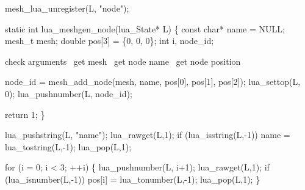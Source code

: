 \nwenddocs{}\endmoddef
mesh_lua_unregister(L, "node");
\nwendcode{}\nwdocspar

\nwenddocs{}\endmoddef
static int lua_meshgen_node(lua_State* L)
\{
    const char* name = NULL;
    mesh_t mesh;
    double pos[3] = \{0, 0, 0\};
    int i, node_id;

    \LA{}check arguments~{\nwtagstyle{}}\RA{}
    \LA{}get \code{}mesh\edoc{}~{\nwtagstyle{}}\RA{}
    \LA{}get node name~{\nwtagstyle{}}\RA{}
    \LA{}get node position~{\nwtagstyle{}}\RA{}

    node_id = mesh_add_node(mesh, name, pos[0], pos[1], pos[2]);
    lua_settop(L, 0);
    lua_pushnumber(L, node_id);

    return 1;
\}

\nwendcode{}\nwdocspar

\nwenddocs{}\endmoddef
lua_pushstring(L, "name");
lua_rawget(L,1);
if (lua_isstring(L,-1))
    name = lua_tostring(L,-1);
lua_pop(L,1);
\nwendcode{}\nwdocspar

\nwenddocs{}\endmoddef
for (i = 0; i < 3; ++i) \{
    lua_pushnumber(L, i+1);
    lua_rawget(L,1);
    if (lua_isnumber(L,-1))
        pos[i] = lua_tonumber(L,-1);
    lua_pop(L,1);
\}
\nwendcode{}\nwdocspar

